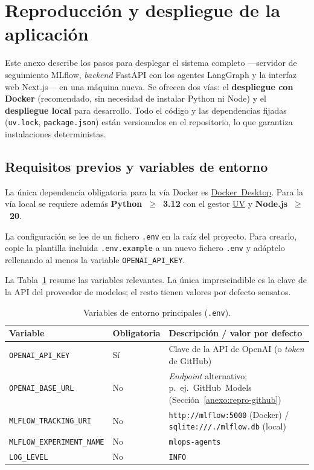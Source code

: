 \section{Reproducción y despliegue de la aplicación}
\label{anexo:reproduccion}

Este anexo describe los pasos para desplegar el sistema completo —servidor de
seguimiento MLflow, \textit{backend} FastAPI con los agentes LangGraph y la interfaz
web Next.js— en una máquina nueva. Se ofrecen dos vías: el \textbf{despliegue con
Docker} (recomendado, sin necesidad de instalar Python ni Node) y el \textbf{despliegue
local} para desarrollo. Todo el código y las dependencias fijadas (\texttt{uv.lock},
\texttt{package.json}) están versionados en el repositorio, lo que garantiza
instalaciones deterministas.

\subsection{Requisitos previos y variables de entorno}
\label{anexo:repro-requisitos}

La única dependencia obligatoria para la vía Docker es
\href{https://www.docker.com/products/docker-desktop/}{Docker~Desktop}. Para la vía
local se requiere además \textbf{Python~$\geq$~3.12} con el gestor
\href{https://docs.astral.sh/uv/}{UV} y \textbf{Node.js~$\geq$~20}.

La configuración se lee de un fichero \texttt{.env} en la raíz del proyecto. Para
crearlo, copie la plantilla incluida \texttt{.env.example} a un nuevo fichero
\texttt{.env} y adáptelo rellenando al menos la variable \texttt{OPENAI\_API\_KEY}.

La Tabla~\ref{tab:repro-env} resume las variables relevantes. La única imprescindible
es la clave de la API del proveedor de modelos; el resto tienen valores por defecto
sensatos.

\begin{table}[H]
\centering
\caption{Variables de entorno principales (\texttt{.env}).}
\label{tab:repro-env}
\small
\setlength{\tabcolsep}{5pt}
\begin{tabular}{lll}
\toprule
\textbf{Variable} & \textbf{Obligatoria} & \textbf{Descripción / valor por defecto} \\
\midrule
\texttt{OPENAI\_API\_KEY}        & Sí & Clave de la API de OpenAI (o \textit{token} de GitHub) \\
\texttt{OPENAI\_BASE\_URL}       & No & \textit{Endpoint} alternativo; p.~ej.\ GitHub~Models
                                       (Sección~\ref{anexo:repro-github}) \\
\texttt{MLFLOW\_TRACKING\_URI}   & No & \texttt{http://mlflow:5000} (Docker) /
                                       \texttt{sqlite:///./mlflow.db} (local) \\
\texttt{MLFLOW\_EXPERIMENT\_NAME}& No & \texttt{mlops-agents} \\
\texttt{LOG\_LEVEL}              & No & \texttt{INFO} \\
\bottomrule
\end{tabular}
\end{table}


